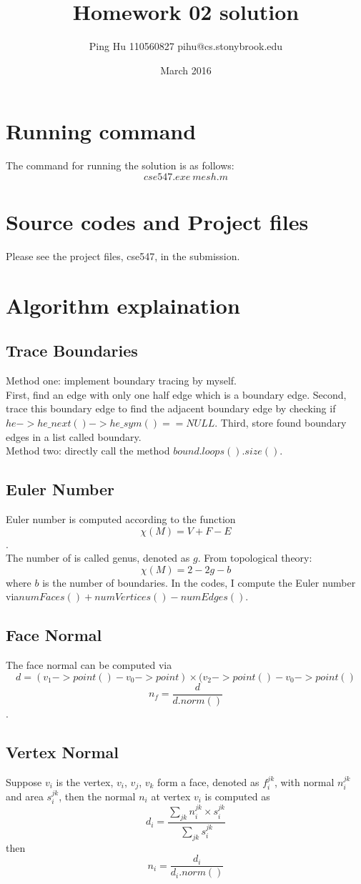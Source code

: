 \documentclass{article}
\title{Homework 02 solution}
\author{Ping Hu 110560827 pihu@cs.stonybrook.edu}
\date{March 2016}
\begin{document}
\maketitle

\section{Running command}
The command for running the solution is as follows: $${cse547.exe\ mesh.m}$$

\section{Source codes and Project files}
Please see the project files, cse547, in the submission. 

\section{Algorithm explaination}
\subsection{Trace Boundaries}
Method one: implement boundary tracing by myself. \\
First, find an edge with only one half edge which is a boundary edge. Second, trace this boundary edge to find the adjacent boundary edge by checking if ${he->he\_next()->he\_sym() == NULL}$. Third, store found boundary edges in a list called boundary. \\
Method two: directly call the method ${bound.loops().size()}$. 
\subsection{Euler Number}
Euler number is computed according to the function $$\chi(M)=V+F-E$$.
\\ The number of  is called genus, denoted as $g$. From topological theory: $$\chi(M)=2-2g-b$$ where $b$ is the number of boundaries. In the codes, I compute the Euler number via$numFaces() + numVertices() -numEdges()$. 
\subsection{Face Normal}
The face normal can be computed via
$$d = (v_1->point()-v_0->point) \times (v_2->point()-v_0->point()$$
$$n_f=\frac{d}{d.norm()}$$.
\subsection{Vertex Normal}
Suppose $v_i$ is the vertex, $v_i$, $v_j$, $v_k$ form a face, denoted as $f^{jk}_i$, with normal $n^{jk}_i$ and area $s^{jk}_i$, then the normal $n_i$ at vertex $v_i$ is computed as $$d_i=\frac{\sum_{jk}n^{jk}_i \times s^{jk}_i}{\sum_{jk} s^{jk}_i}$$ then $$n_i = \frac{d_i}{d_i.norm()}$$
\end{document}
